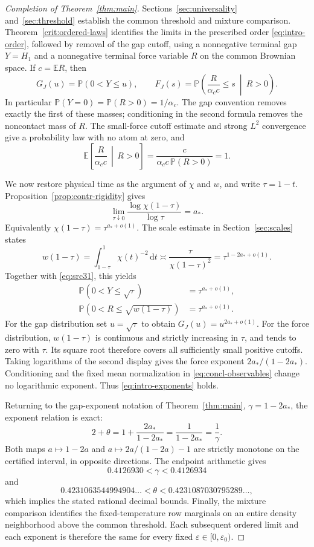 \documentclass[11pt,a4paper]{article}
\numberwithin{equation}{section}
\theoremstyle{definition}
\theoremstyle{remark}
\newcommand{\E}{\mathbb E}
\newcommand{\Prob}{\mathbb P}
\newcommand{\dd}{\mathrm d}
\newcommand{\eps}{\varepsilon}
\begin{document}
\begin{proof}[Completion of Theorem~\ref{thm:main}]
Sections~\ref{sec:universality} and~\ref{sec:threshold} establish the common threshold and mixture comparison. Theorem~\ref{crit:ordered-laws} identifies the limits in the prescribed order \eqref{eq:intro-order}, followed by removal of the gap cutoff, using a nonnegative terminal gap $Y=H_1$ and a nonnegative terminal force variable $R$ on the common Brownian space. If $c=\E R$, then
\begin{equation}\label{eq:concl-observables}
 G_J(u)=\Prob(0<Y\le u),\qquad
 F_J(s)=\Prob\left(\frac{R}{\alpha_c c}\le s\ \middle|\ R>0\right).
\end{equation}
In particular $\Prob(Y=0)=\Prob(R>0)=1/\alpha_c$. The gap convention removes exactly the first of these masses; conditioning in the second formula removes the noncontact mass of $R$. The small-force cutoff estimate and strong $L^2$ convergence give a probability law with no atom at zero, and
\[
 \E\left[\frac{R}{\alpha_c c}\,\middle|\,R>0\right]
 =\frac{c}{\alpha_c c\,\Prob(R>0)}=1.
\]

We now restore physical time as the argument of $\chi$ and $w$, and
write $\tau=1-t$. Proposition~\ref{prop:contr-rigidity} gives
\[
 \lim_{\tau\downarrow0}\frac{\log\chi(1-\tau)}{\log\tau}=a_*.
\]
Equivalently $\chi(1-\tau)=\tau^{a_*+o(1)}$. The scale estimate in Section~\ref{sec:scales} states
\[
 w(1-\tau)=\int_{1-\tau}^{1}\chi(t)^{-2}\,\dd t
             \asymp\frac{\tau}{\chi(1-\tau)^2}
             =\tau^{1-2a_*+o(1)}.
\]
Together with \eqref{eq:src31}, this yields
\begin{align*}
 \Prob(0<Y\le\sqrt\tau)&=\tau^{a_*+o(1)},\\
 \Prob(0<R\le\sqrt{w(1-\tau)})&=\tau^{a_*+o(1)}.
\end{align*}
For the gap distribution set $u=\sqrt\tau$ to obtain
$G_J(u)=u^{2a_*+o(1)}$.
For the force distribution, $w(1-\tau)$ is continuous and strictly increasing in $\tau$, and tends to zero with $\tau$. Its square root therefore covers all sufficiently small positive cutoffs. Taking logarithms of the second display gives the force exponent $2a_* /(1-2a_*)$. Conditioning and the fixed mean normalization in \eqref{eq:concl-observables} change no logarithmic exponent. Thus \eqref{eq:intro-exponents} holds.

Returning to the gap-exponent notation of Theorem~\ref{thm:main},
$\gamma=1-2a_*$, the exponent relation is exact:
\[
 2+\theta=1+\frac{2a_*}{1-2a_*}
          =\frac1{1-2a_*}=\frac1\gamma.
\]
Both maps $a\mapsto1-2a$ and $a\mapsto2a/(1-2a)-1$ are strictly monotone on the certified interval, in opposite directions. The endpoint arithmetic gives
\[
 0.4126930<\gamma<0.4126934
\]
and
\[
 0.4231063544994904\ldots<\theta<0.4231087030795289\ldots,
\]
which implies the stated rational decimal bounds. Finally, the mixture comparison identifies the fixed-temperature row marginals on an entire density neighborhood above the common threshold. Each subsequent ordered limit and each exponent is therefore the same for every fixed $\eps\in[0,\eps_0)$.
\end{proof}
\end{document}
